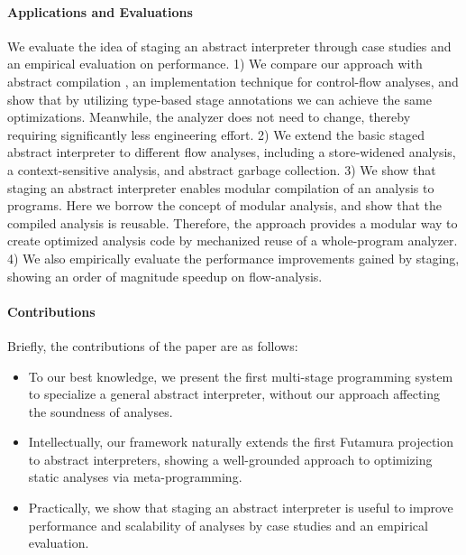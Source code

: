 \paragraph{Applications and Evaluations}
We evaluate the idea of staging an abstract interpreter through
case studies and an empirical evaluation on performance.
1) We compare our approach with abstract compilation
\cite{Boucher:1996:ACN:647473.727587}, an implementation technique for
control-flow analyses, and show that by utilizing type-based stage
annotations we can achieve the same optimizations. Meanwhile,
the analyzer does not need to change, thereby requiring significantly less
engineering effort.
2) We extend the basic staged abstract interpreter to different flow
analyses, including a store-widened analysis, a context-sensitive
analysis, and abstract garbage collection.
3) We show that staging an abstract interpreter enables modular
compilation of an analysis to programs. Here we borrow the concept of
modular analysis, and show that the compiled analysis is reusable.
Therefore, the approach provides a modular way to create optimized
analysis code by mechanized reuse of a whole-program analyzer.
4) We also empirically evaluate the performance improvements gained by staging,
showing an order of magnitude speedup on flow-analysis.

\paragraph{Contributions} Briefly, the contributions of the paper are as follows:
\begin{itemize}[leftmargin=2em]
  \item To our best knowledge, we present the first
    multi-stage programming system to specialize a general abstract interpreter,
    without our approach affecting the soundness of analyses.
  \item Intellectually, our framework naturally extends the first
    Futamura projection to abstract interpreters, showing a
    well-grounded approach to optimizing static analyses via
    meta-programming.
  \item Practically, we show that staging an abstract interpreter is
    useful to improve performance and scalability of analyses by case
    studies and an empirical evaluation.
\end{itemize}

